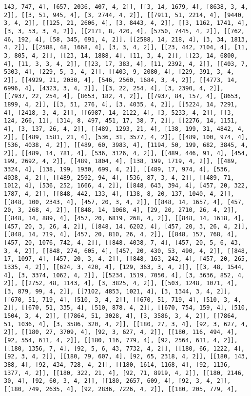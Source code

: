 \documentclass[12pt,fleqn]{article}\usepackage{../../common}
\begin{document}
\begin{verbatim}
143, 747, 4], [657, 2036, 407, 4, 2]], [[3, 14, 1679, 4], [8638, 3, 4, 2]], [[3, 51, 945, 4], [3, 2744, 4, 2]], [[7911, 51, 2214, 4], [9440, 3, 4, 2]], [[125, 21, 2606, 4], [3, 8443, 4, 2]], [[3, 1162, 1741, 4], [3, 3, 53, 3, 4, 2]], [[2171, 8, 420, 4], [5750, 7445, 4, 2]], [[762, 46, 192, 4], [58, 345, 691, 4, 2]], [[2588, 14, 218, 4], [3, 34, 1813, 4, 2]], [[2588, 48, 1668, 4], [3, 3, 4, 2]], [[23, 442, 7104, 4], [11, 3, 805, 4, 2]], [[23, 14, 1888, 4], [11, 3, 4, 2]], [[23, 14, 6800, 4], [11, 3, 3, 4, 2]], [[23, 17, 383, 4], [11, 2392, 4, 2]], [[403, 7, 5303, 4], [229, 5, 3, 4, 2]], [[403, 9, 2080, 4], [229, 391, 3, 4, 2]], [[4929, 21, 2030, 4], [546, 2560, 1684, 3, 4, 2]], [[4773, 14, 6996, 4], [4323, 3, 4, 2]], [[3, 22, 254, 4], [3, 2390, 4, 2]], [[7937, 22, 254, 4], [8653, 182, 4, 2]], [[7937, 84, 157, 4], [8653, 1899, 4, 2]], [[3, 51, 276, 4], [3, 4035, 4, 2]], [[5224, 14, 7291, 4], [2418, 3, 4, 2]], [[6987, 14, 2122, 4], [3, 5233, 4, 2]], [[3, 124, 266, 11], [314, 8, 497, 451, 17, 38, 7, 2]], [[2276, 14, 1151, 4], [3, 137, 26, 4, 2]], [[489, 1293, 21, 4], [138, 199, 31, 4842, 4, 2]], [[489, 1581, 21, 4], [536, 31, 3577, 4, 2]], [[489, 100, 974, 4], [536, 4038, 4, 2]], [[489, 60, 3983, 4], [1194, 50, 199, 682, 3845, 4, 2]], [[489, 14, 781, 4], [536, 3126, 4, 2]], [[489, 446, 91, 4], [454, 199, 2692, 4, 2]], [[489, 1804, 4], [138, 199, 1719, 4, 2]], [[489, 3324, 4], [138, 199, 1930, 699, 4, 2]], [[489, 17, 974, 4], [536, 4038, 4, 2]], [[489, 2592, 94, 4], [536, 87, 3, 4, 2]], [[489, 71, 1012, 4], [536, 252, 1666, 4, 2]], [[848, 643, 394, 4], [457, 20, 322, 1787, 4, 2]], [[848, 442, 133, 4], [138, 8, 20, 137, 1040, 4, 2]], [[848, 100, 2343, 4], [457, 20, 3, 4, 2]], [[848, 14, 1657, 4], [457, 20, 3, 268, 4, 2]], [[848, 14, 1068, 4], [29, 20, 2710, 26, 4, 2]], [[848, 14, 889, 4], [457, 20, 6819, 268, 4, 2]], [[848, 14, 1618, 4], [457, 20, 3, 26, 4, 2]], [[848, 14, 6202, 4], [457, 20, 3, 26, 4, 2]], [[848, 14, 719, 4], [457, 20, 810, 26, 4, 2]], [[848, 157, 768, 4], [457, 20, 1076, 742, 4, 2]], [[848, 4038, 7, 4], [457, 20, 5, 6, 43, 3, 4, 2]], [[848, 274, 605, 4], [457, 20, 430, 53, 490, 4, 2]], [[848, 17, 1097, 4], [457, 20, 3, 4, 2]], [[848, 163, 242, 4], [457, 20, 265, 1335, 4, 2]], [[624, 3, 420, 4], [129, 363, 3, 4, 2]], [[3, 48, 1544, 4], [3, 3374, 1062, 4, 2]], [[5234, 1519, 7050, 4], [3, 3636, 852, 4, 2]], [[2752, 48, 1143, 4], [3, 3825, 4, 2]], [[503, 1248, 1071, 4], [3, 879, 99, 4, 2]], [[7102, 4853, 1021, 4], [3, 1344, 3, 4, 2]], [[670, 51, 719, 4], [510, 3, 4, 2]], [[670, 51, 719, 4], [510, 3, 4, 2]], [[670, 51, 335, 4], [510, 878, 4, 2]], [[670, 754, 159, 4], [510, 1504, 3, 4, 2]], [[7864, 51, 3028, 4], [3, 3586, 3, 4, 2]], [[7864, 51, 1036, 4], [3, 3586, 320, 4, 2]], [[180, 27, 3, 4], [92, 3, 627, 4, 2]], [[180, 27, 3709, 4], [92, 3, 627, 4, 2]], [[180, 116, 494, 4], [92, 554, 611, 4, 2]], [[180, 116, 779, 4], [92, 2564, 611, 4, 2]], [[180, 1356, 7, 4], [92, 5, 6, 43, 7732, 4, 2]], [[180, 66, 1222, 4], [92, 3, 4, 2]], [[180, 79, 607, 4], [92, 65, 2318, 4, 2]], [[180, 143, 388, 4], [92, 434, 728, 4, 2]], [[180, 1614, 1168, 4], [92, 1136, 1377, 4, 2]], [[180, 322, 21, 4], [92, 71, 8919, 4, 2]], [[180, 2146, 30, 4], [92, 60, 3, 4, 2]], [[180, 2657, 609, 4], [92, 3, 4, 2]], [[180, 749, 2635, 4], [92, 2836, 7226, 4, 2]], [[180, 205, 779, 4], 
\end{verbatim}
\end{document}
